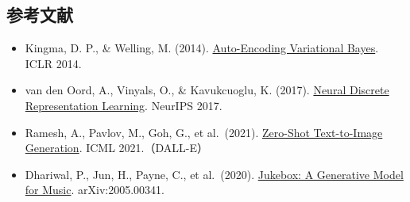 \hypertarget{ux53c2ux8003ux6587ux732e-40}{%
\subsection{参考文献}\label{ux53c2ux8003ux6587ux732e-40}}

\vspace{0.25em}
\begin{itemize}
\tightlist
\item
  Kingma, D. P., \& Welling, M. (2014). \href{https://arxiv.org/abs/1312.6114}{Auto-Encoding Variational Bayes}. ICLR 2014.
\item
  van den Oord, A., Vinyals, O., \& Kavukcuoglu, K. (2017). \href{https://arxiv.org/abs/1711.00937}{Neural Discrete Representation Learning}. NeurIPS 2017.
\item
  Ramesh, A., Pavlov, M., Goh, G., et al.~(2021). \href{https://arxiv.org/abs/2102.12092}{Zero-Shot Text-to-Image Generation}. ICML 2021.（DALL-E）
\item
  Dhariwal, P., Jun, H., Payne, C., et al.~(2020). \href{https://arxiv.org/abs/2005.00341}{Jukebox: A Generative Model for Music}. arXiv:2005.00341.
\end{itemize}

\clearpage

